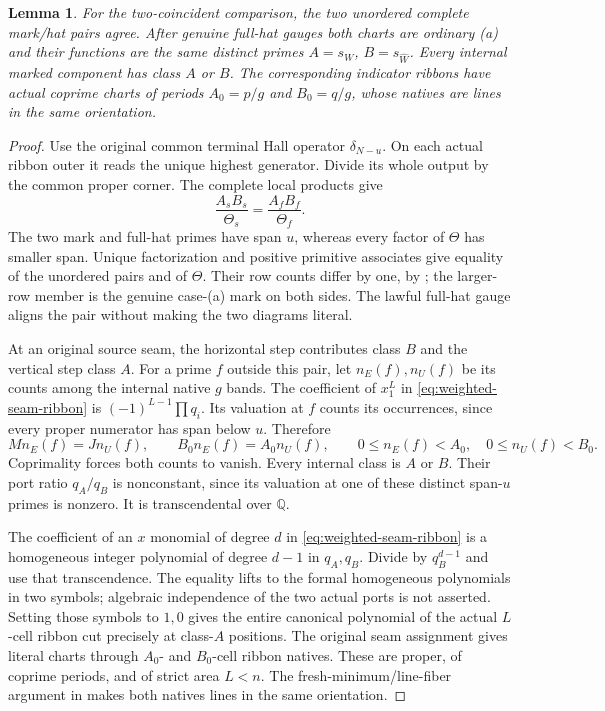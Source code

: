 \documentclass[11pt,a4paper]{amsart}
\numberwithin{equation}{section}
\theoremstyle{plain}
\newtheorem{lemma}[theorem]{Lemma}
\theoremstyle{definition}
\newcommand{\Q}{\mathbb Q}
\begin{document}
\begin{lemma}\label{lem:mark-pair}
For the two-coincident comparison, the two unordered complete mark/hat
pairs agree.  After genuine full-hat gauges both charts are ordinary (a)
and their functions are the same distinct primes \(A=s_W\), \(B=s_{\widehat W}\).
Every internal marked component has class \(A\) or \(B\).  The corresponding
indicator ribbons have actual coprime charts of periods \(A_0=p/g\) and
\(B_0=q/g\), whose natives are lines in the same orientation.
\end{lemma}
\begin{proof}
Use the original common terminal Hall operator \(\delta_{N-u}\).
On each actual ribbon outer it reads the unique highest generator.
Divide its whole output by the common proper corner.  The complete
local products give
\[
 \frac{A_sB_s}{\Theta_s}=\frac{A_fB_f}{\Theta_f}.
\]
The two mark and full-hat primes have span \(u\), whereas every factor of
\(\Theta\) has smaller span.  Unique factorization and positive primitive
associates give equality of the unordered pairs and of \(\Theta\).
Their row counts differ by one, by ; the larger-row
member is the genuine case-(a) mark on both sides.  The lawful full-hat
gauge aligns the pair without making the two diagrams literal.

At an original source seam, the horizontal step contributes class \(B\)
and the vertical step class \(A\).  For a prime \(f\) outside this pair, let
\(n_E(f),n_U(f)\) be its counts among the internal native \(g\) bands.
The coefficient of \(x_1^L\) in \eqref{eq:weighted-seam-ribbon} is
\((-1)^{L-1}\prod q_i\).  Its valuation at \(f\) counts its occurrences,
since every proper numerator has span below \(u\).  Therefore
\[
 M n_E(f)=J n_U(f),\qquad
 B_0n_E(f)=A_0n_U(f),\qquad
 0\le n_E(f)<A_0,\quad0\le n_U(f)<B_0.
\]
Coprimality forces both counts to vanish.  Every internal class is \(A\) or
\(B\).  Their port ratio \(q_A/q_B\) is nonconstant, since its valuation at
one of these distinct span-\(u\) primes is nonzero.  It is transcendental
over \(\Q\).

The coefficient of an \(x\) monomial of degree \(d\) in
\eqref{eq:weighted-seam-ribbon} is a homogeneous integer polynomial of
degree \(d-1\) in \(q_A,q_B\).  Divide by \(q_B^{d-1}\) and use that
transcendence.  The equality lifts to the formal homogeneous polynomials
in two symbols; algebraic independence of the two actual ports is not
asserted.  Setting those symbols to \(1,0\) gives the entire canonical
polynomial of the actual \(L\)-cell ribbon cut precisely at class-\(A\)
positions.  The original seam assignment gives literal charts through
\(A_0\)- and \(B_0\)-cell ribbon natives.  These are proper, of coprime periods,
and of strict area \(L<n\).  The fresh-minimum/line-fiber argument in
 makes both natives lines in the same orientation.
\end{proof}
\end{document}
